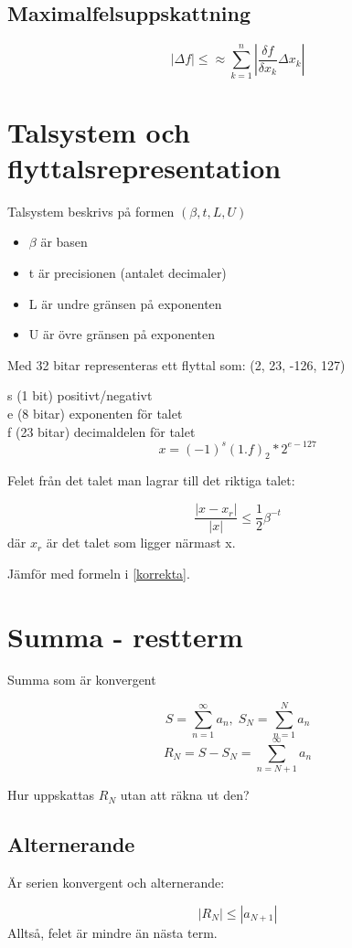 \documentclass[12pt,a4paper]{article}
\begin{document}
\subsection{Maximalfelsuppskattning}

$$ | \Delta f| \leq \approx \sum_{k=1}^{n} | \frac{\delta f}{\delta x_k} \Delta x_k| $$


\section{Talsystem och flyttalsrepresentation}
Talsystem beskrivs på formen $(\beta, t, L, U)$
\begin{itemize}
	\item{$\beta$ är basen}
	\item{t är precisionen (antalet decimaler)}
	\item{L är undre gränsen på exponenten}
	\item{U är övre gränsen på exponenten}
\end{itemize}

Med 32 bitar representeras ett flyttal som:
(2, 23, -126, 127)

s (1 bit) positivt/negativt \\
e (8 bitar) exponenten för talet \\
f (23 bitar) decimaldelen för talet \\
\Large
$$ x = (-1)^s(1.f)_2*2^{e-127} $$
\large

Felet från det talet man lagrar till det riktiga talet:

\Large
$$ \frac{|x-x_r|}{|x|} \leq \frac{1}{2}\beta^{-t}$$
\large
där $x_r$ är det talet som ligger närmast x.

Jämför med formeln i \ref{korrekta}.

\section{Summa - restterm}
Summa som är konvergent

$$ S = \sum_{n=1}^{\infty} a_n, \;
 S_N = \sum_{n=1}^{N} a_n$$
$$ R_N = S - S_N = \sum_{n=N+1}^{\infty} a_n $$

Hur uppskattas $R_N$ utan att räkna ut den?

\subsection{Alternerande}
Är serien konvergent och alternerande:

$$ |R_N| \leq |a_{N+1}|$$
Alltså, felet är mindre än nästa term.
\end{document}
